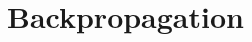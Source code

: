 \documentclass[12pt,a4paper,twoside,openright]{report}
\begin{document}


\printbibliography







\newpage

\appendix

\chapter{Backpropagation} \label{backprop}
\end{document}
